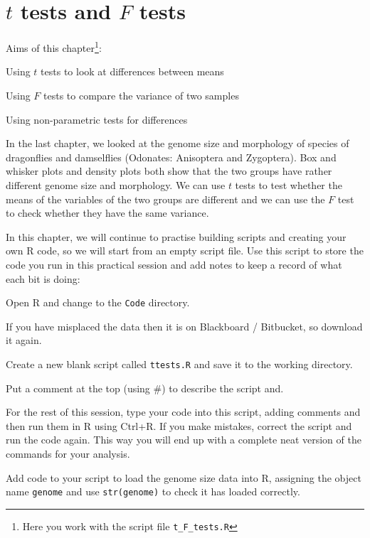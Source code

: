 
\chapter{$t$ tests and $F$ tests}
\label{ch:t_F_tests}

Aims of this chapter\footnote{Here you work with the script file {\tt t\_F\_tests.R}}:
\begin{compactitem}
	\item Using $t$ tests to look at differences between means
	\item Using $F$ tests to compare the variance of two samples
	\item Using non-parametric tests for differences
\end{compactitem}

In the last chapter, we looked at the genome size and morphology of 
species of dragonflies and damselflies (Odonates: Anisoptera and 
Zygoptera). Box and whisker plots and density plots both show that the 
two groups have rather different genome size and morphology. We can use 
$t$ tests to test whether the means of the variables of the two groups 
are different and we can use the $F$ test to check whether they have 
the same variance.

In this chapter, we will continue to practise building scripts and 
creating your own R code, so we will start from an empty script file. 
Use this script to store the code you run in this practical session and 
add notes to keep a record of what each bit is doing:

\begin{compactitem}[$\quad\star$]
	\item Open R and change to the {\tt Code} directory.
	\item If you have misplaced the data then it is on Blackboard / 
	Bitbucket, so download it again.
	\item Create a new blank script called {\tt ttests.R} and save it to 
	the working directory.
	\item Put a comment at the top (using \#) to describe the script 
	and.
	\item For the rest of this session, type your code into this script, 
	adding comments and then run them in R using Ctrl+R. If you make 
	mistakes, correct the script and run the code again. This way you 
	will end up with a complete neat version of the commands for your 
	analysis. 
	\item Add code to your script to load the genome size data into R, 
	assigning the object name {\tt genome} and use {\tt str(genome)} to 
	check it has loaded correctly.
\end{compactitem}

